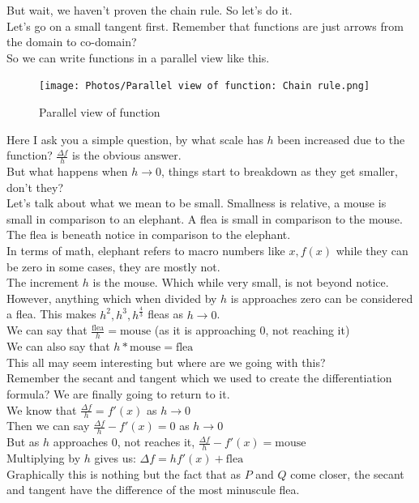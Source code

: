 But wait, we haven't proven the chain rule. So let's do it.\\
Let's go on a small tangent first. Remember that functions are just arrows from the domain to co-domain?\\
So we can write functions in a parallel view like this.
\begin{figure} [h]
    \centering
    \texttt{[image: Photos/Parallel view of function: Chain rule.png]}
    \caption{Parallel view of function}
    
\end{figure}
Here I ask you a simple question, by what scale has $h$ been increased due to the function? $\frac{\Delta f}{h}$ is the obvious answer.\\
But what happens when $h \rightarrow 0$, things start to breakdown as they get smaller, don't they?\\
Let's talk about what we mean to be small. Smallness is relative, a mouse is small in comparison to an elephant. A flea is small in comparison to the mouse. The flea is beneath notice in comparison to the elephant.\\
In terms of math, elephant refers to macro numbers like $x, f(x)$ while they can be zero in some cases, they are mostly not.\\
The increment $h$ is the mouse. Which while very small, is not beyond notice. However, anything which when divided by $h$ is approaches zero can be considered a flea. This makes $h^2, h^3, h^{\frac{4}{3}}$ fleas as $h \rightarrow 0$.\\
We can say that $\frac{\text{flea}}{h}=\text{mouse}$ (as it is approaching 0, not reaching it)\\
We can also say that $h*\text{mouse}=\text{flea}$\\
This all may seem interesting but where are we going with this?\\
Remember the secant and tangent which we used to create the differentiation formula? We are finally going to return to it.\\
We know that $\frac{\Delta f}{h}=f'(x)$ as $h \rightarrow 0$\\
Then we can say $\frac{\Delta f}{h}-f'(x)=0$ as $h \rightarrow 0$\\
But as $h$ approaches $0$, not reaches it,  $\frac{\Delta f}{h}-f'(x)= \text{mouse}$\\
Multiplying by $h$ gives us: $\Delta f = hf'(x)+ \text{flea}$\\
Graphically this is nothing but the fact that as $P$ and $Q$ come closer, the secant and tangent have the difference of the most minuscule flea.\\
